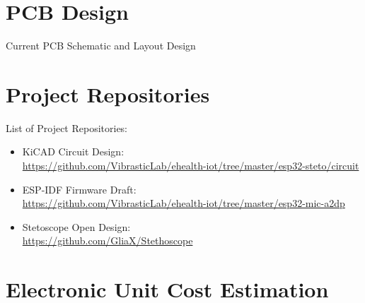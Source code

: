 \documentclass[a4paper,12pt,oneside,pdflatex,italian,final,twocolumn]{article}
\begin{document}
	\raggedright
	\section{PCB Design}

	Current PCB Schematic and Layout Design
	
	\newpage
	
	
	\newpage
	
	
	\newpage
	
	
	\newpage
	\section{Project Repositories}
	
	List of Project Repositories:
	\begin{itemize}
		\item KiCAD Circuit Design: \\
		\url{https://github.com/VibrasticLab/ehealth-iot/tree/master/esp32-steto/circuit}
		
		\item ESP-IDF Firmware Draft: \\
		\url{https://github.com/VibrasticLab/ehealth-iot/tree/master/esp32-mic-a2dp}
		
		\item Stetoscope Open Design: \\
		\url{https://github.com/GliaX/Stethoscope}
	\end{itemize}
	
	\section{Electronic Unit Cost Estimation}
	
\end{document}
